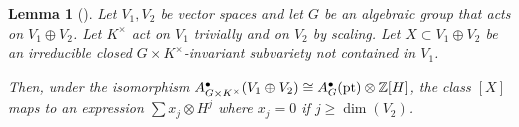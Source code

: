 \documentclass[12pt]{amsart}
\newcommand{\mb}{\mathbb}
\newcommand{\pt}{{\rm pt}}
\theoremstyle{plain}
\newtheorem{Lem}[Thm]{Lemma}
\theoremstyle{definition}
\newtheorem{Rem}[Thm]{Remark}
\theoremstyle{remark}
\begin{document}
\begin{Lem}
[{\cite[Theorem 2.1]{FR07}}]
\label{FRL}
Let $V_1,V_2$ be vector spaces and let $G$ be an algebraic group that acts on $V_1\oplus V_2$. Let $K^{\times}$ act on $V_1$ trivially and on $V_2$ by scaling. Let $X\subset V_1\oplus V_2$ be an irreducible closed $G\times K^{\times}$-invariant subvariety not contained in $V_1$. 

Then, under the isomorphism $A_{G\times K^{\times}}^{\bullet}(V_1\oplus V_2)\cong A_{G}^{\bullet}(\pt)\otimes \mb{Z}[H]$, the class $[X]$ maps to an expression $\sum x_j\otimes H^j$ where $x_j=0$ if $j\geq \dim(V_2)$. 
\end{Lem}

\end{document}
